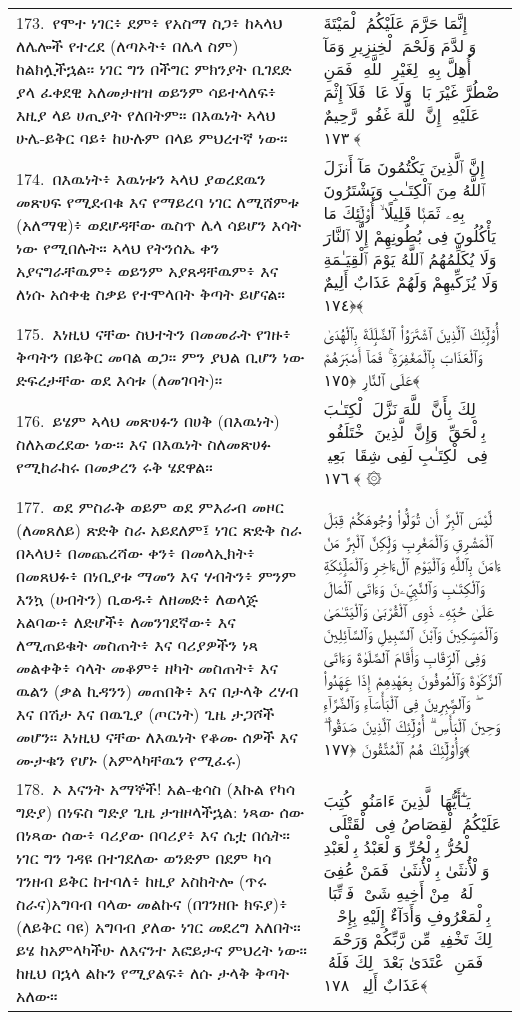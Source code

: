 \documentclass[11pt,a4paper,oneside]{article}%
\newcommand{\mytextarabic}[1]{\textarabic{ #1 \flushright}}
\begin{document}
\begin{longtable}{%
  @{}
    p{}
  @{~~~}
    p{}
    @{}
}
173.\ የሞተ ነገር፥ ደም፥ የአስማ ስጋ፥ ከኣላህ ለሌሎች የተረደ (ለጣኦት፥ በሌላ ስም) ከልክሏችኋል። ነገር ግን በችግር ምክንያት ቢገደድ ያላ ፈቀደዊ አለመታዘዝ ወይንም ሳይተላለፍ፥ እዚያ ላይ ሀጢያት የለበትም። በእዉነት ኣላህ ሁሌ-ይቅር ባይ፥ ከሁሉም በላይ ምህረተኛ ነው።  &  \mytextarabic{ إِنَّمَا حَرَّمَ عَلَيْكُمُ ٱلْمَيْتَةَ وَٱلدَّمَ وَلَحْمَ ٱلْخِنزِيرِ وَمَآ أُهِلَّ بِهِۦ لِغَيْرِ ٱللَّهِ ۖ فَمَنِ ٱضْطُرَّ غَيْرَ بَاغٍۢ وَلَا عَادٍۢ فَلَآ إِثْمَ عَلَيْهِ ۚ إِنَّ ٱللَّهَ غَفُورٌۭ رَّحِيمٌ ﴿١٧٣﴾}\\
174.\ በእዉነት፥ እዉነቱን ኣላህ ያወረደዉን መጽሀፍ የሚደብቁ እና የማይረባ ነገር ለሚሸምቱ (አለማዊ)፥ ወደሆዳቸው ዉስጥ ሌላ ሳይሆን እሳት ነው የሚበሉት። ኣላህ የትንሰኤ ቀን አያናግራቸዉም፥ ወይንም አያጸዳቸዉም፥ እና ለነሱ አሰቀቂ ስቃይ የተሞላበት ቅጣት ይሆናል። &  \mytextarabic{إِنَّ ٱلَّذِينَ يَكْتُمُونَ مَآ أَنزَلَ ٱللَّهُ مِنَ ٱلْكِتَـٰبِ وَيَشْتَرُونَ بِهِۦ ثَمَنًۭا قَلِيلًا ۙ أُو۟لَٟٓئِكَ مَا يَأْكُلُونَ فِى بُطُونِهِمْ إِلَّا ٱلنَّارَ وَلَا يُكَلِّمُهُمُ ٱللَّهُ يَوْمَ ٱلْقِيَـٰمَةِ وَلَا يُزَكِّيهِمْ وَلَهُمْ عَذَابٌ أَلِيمٌ ﴿١٧٤﴾}\\
175.\ እነዚህ ናቸው ስህተትን በመመራት የገዙ፥ ቅጣትን በይቅር መባል ወጋ። ምን ያህል ቢሆን ነው ድፍረታቸው ወደ እሳቱ (ለመገባት)። &  \mytextarabic{ أُو۟لَٟٓئِكَ ٱلَّذِينَ ٱشْتَرَوُا۟ ٱلضَّلَٟلَةَ بِٱلْهُدَىٰ وَٱلْعَذَابَ بِٱلْمَغْفِرَةِ ۚ فَمَآ أَصْبَرَهُمْ عَلَى ٱلنَّارِ ﴿١٧٥﴾}\\
176.\ ይሄም ኣላህ መጽሀፉን በሀቅ (በእዉነት) ስለአወረደው ነው። እና በእዉነት ስለመጽሀፉ የሚከራከሩ በመቃረን ሩቅ ሄደዋል። &  \mytextarabic{ذَٟلِكَ بِأَنَّ ٱللَّهَ نَزَّلَ ٱلْكِتَـٰبَ بِٱلْحَقِّ ۗ وَإِنَّ ٱلَّذِينَ ٱخْتَلَفُوا۟ فِى ٱلْكِتَـٰبِ لَفِى شِقَاقٍۭ بَعِيدٍۢ ﴿١٧٦﴾ ۞}\\
177.\ ወደ ምስራቅ ወይም ወደ ምእራብ መዞር (ለመጸለይ) ጽድቅ ስራ አይደለም፤ ነገር ጽድቅ ስራ በኣላህ፥ በመጨረሻው ቀን፥ በመላኢክት፥ በመጸህፉ፥ በነቢያቱ ማመን እና ሃብትን፥ ምንም እንኳ (ሀብትን) ቢወዱ፥ ለዘመድ፥ ለወላጅ አልባው፥ ለድሆች፥ ለመንገደኛው፥ እና ለሚጠይቁት መስጠት፥ እና ባሪያዎችን ነጻ መልቀቅ፥ ሳላት መቆም፥ ዘካት መስጠት፥ እና ዉልን (ቃል ኪዳንን) መጠበቅ፥ እና በታላቅ ረሃብ እና በሽታ እና በዉጊያ (ጦርነት) ጊዜ ታጋሾች መሆን። እነዚህ ናቸው ለእዉነት የቆሙ ሰዎች እና ሙታቁን የሆኑ (አምላካቸዉን የሚፈሩ) &  \mytextarabic{  لَّيْسَ ٱلْبِرَّ أَن تُوَلُّوا۟ وُجُوهَكُمْ قِبَلَ ٱلْمَشْرِقِ وَٱلْمَغْرِبِ وَلَٟكِنَّ ٱلْبِرَّ مَنْ ءَامَنَ بِٱللَّهِ وَٱلْيَوْمِ ٱلْءَاخِرِ وَٱلْمَلَٟٓئِكَةِ وَٱلْكِتَـٰبِ وَٱلنَّبِيِّۦنَ وَءَاتَى ٱلْمَالَ عَلَىٰ حُبِّهِۦ ذَوِى ٱلْقُرْبَىٰ وَٱلْيَتَـٰمَىٰ وَٱلْمَسَٟكِينَ وَٱبْنَ ٱلسَّبِيلِ وَٱلسَّآئِلِينَ وَفِى ٱلرِّقَابِ وَأَقَامَ ٱلصَّلَوٰةَ وَءَاتَى ٱلزَّكَوٰةَ وَٱلْمُوفُونَ بِعَهْدِهِمْ إِذَا عَٟهَدُوا۟ ۖ وَٱلصَّٟبِرِينَ فِى ٱلْبَأْسَآءِ وَٱلضَّرَّآءِ وَحِينَ ٱلْبَأْسِ ۗ أُو۟لَٟٓئِكَ ٱلَّذِينَ صَدَقُوا۟ ۖ وَأُو۟لَٟٓئِكَ هُمُ ٱلْمُتَّقُونَ ﴿١٧٧﴾}\\
178.\ ኦ እናንት አማኞች! አል-ቂሳስ (እኩል የካሳ ግድያ) በነፍስ ግድያ ጊዜ ታዝዞላችኋል: ነጻው ሰው በነጻው ሰው፥ ባሪያው በባሪያ፥ እና ሴቷ በሴት። ነገር ግን ገዳዩ በተገደለው ወንድም በደም ካሳ ገንዘብ ይቅር ከተባለ፥ ከዚያ አስከትሎ (ጥሩ ስራና)አግባብ ባላው መልኩና (በገንዘቡ ክፍያ)፥ (ለይቅር ባዩ) አግባብ ያለው ነገር መደረግ አለበት። ይሄ ከአምላካችሁ ለእናንተ እፎይታና ምህረት ነው። ከዚህ በኋላ ልኩን የሚያልፍ፥ ለሱ ታላቅ ቅጣት አለው። &  \mytextarabic{يَـٰٓأَيُّهَا ٱلَّذِينَ ءَامَنُوا۟ كُتِبَ عَلَيْكُمُ ٱلْقِصَاصُ فِى ٱلْقَتْلَى ۖ ٱلْحُرُّ بِٱلْحُرِّ وَٱلْعَبْدُ بِٱلْعَبْدِ وَٱلْأُنثَىٰ بِٱلْأُنثَىٰ ۚ فَمَنْ عُفِىَ لَهُۥ مِنْ أَخِيهِ شَىْءٌۭ فَٱتِّبَاعٌۢ بِٱلْمَعْرُوفِ وَأَدَآءٌ إِلَيْهِ بِإِحْسَٟنٍۢ ۗ ذَٟلِكَ تَخْفِيفٌۭ مِّن رَّبِّكُمْ وَرَحْمَةٌۭ ۗ فَمَنِ ٱعْتَدَىٰ بَعْدَ ذَٟلِكَ فَلَهُۥ عَذَابٌ أَلِيمٌۭ ﴿١٧٨﴾}\\

\end{longtable}
\end{document}
